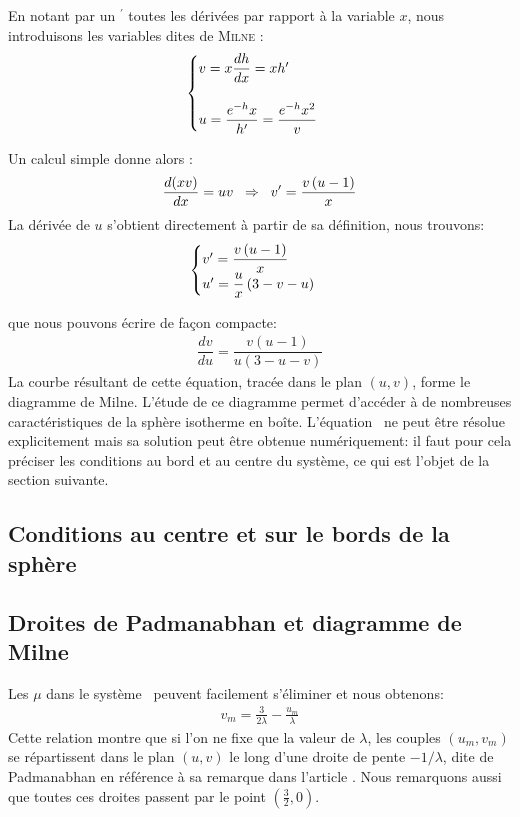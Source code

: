 		En notant par un $^\prime$ toutes les dérivées par rapport à la variable $x$, nous introduisons les variables dites de \textsc{Milne :}
		\begin{align}
			\begin{cases}
			v = x \dfrac{d h}{dx} = x h' \\
			\\
			u = \dfrac{e^{-h} x}{h'} = \dfrac{e^{-h} x^2}{v}
		\end{cases}\label{syst_uv}
		\end{align}
		
Un calcul simple donne alors :
\begin{align}
	\dfrac{d(xv)}{dx} = uv \;\;\Rightarrow\;\; v' = \frac{v \left( u - 1\right)}{x} \notag
\end{align}
La dérivée de $u$ s'obtient directement à partir de sa définition, nous trouvons:
	$$\begin{cases}
		v' = \dfrac{v \left( u - 1\right)}{x} \\
		u' = \dfrac{u}{x}\left(3 - v - u\right)
	\end{cases} \label{systdudv}$$
	
	que nous pouvons écrire de façon compacte:
	\begin{align}
		\dfrac{d v}{d u} = \dfrac{v \left( u - 1\right)}{u \left(3 - u - v\right)}
		\label{eqdudv}
	\end{align}
	La courbe résultant de cette équation, tracée dans le plan $\left(u, v\right)$, forme le diagramme
	de Milne. L'étude de ce diagramme permet d'accéder à de nombreuses caractéristiques de la sphère isotherme en
	boîte. L'équation~ ne peut être résolue explicitement mais sa solution peut être obtenue
	numériquement: il faut pour cela préciser les conditions au bord et au centre du système, ce qui est l'objet de la
	section suivante.
	

\subsection{Conditions au centre et sur le bords de la sphère}
	

\subsection{Droites de Padmanabhan et diagramme de Milne}
	Les $\mu$ dans le système~ peuvent facilement s'éliminer et nous obtenons:
	\begin{align}
		v_m = \frac{3}{2\lambda} - \frac{u_m}{\lambda}\label{droitePb}
	\end{align}
	Cette relation montre que si l'on ne fixe que la valeur de $\lambda$,  les couples $(u_m,v_m)$  se répartissent
	dans le plan $(u,v)$ le long d'une droite de pente $-1/\lambda$, dite de Padmanabhan en référence à sa remarque
	dans l'article \cite{1989ApJS...71..651P}. Nous remarquons aussi que toutes ces droites passent par le point
	$(\frac{3}{2},0)$.
	
